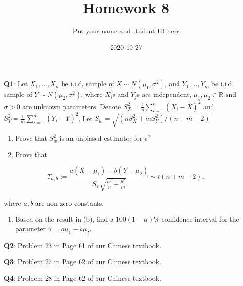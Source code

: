 \documentclass[]{article}
\title{Homework 8}
\author{Put your name and student ID here}
\date{2020-10-27}
\providecommand{\tightlist}{%
  \setlength{\itemsep}{0pt}\setlength{\parskip}{0pt}}
\begin{document}
\maketitle

\textbf{Q1}: Let \(X_1,\dots,X_n\) be i.i.d. sample of
\(X\sim N(\mu_1,\sigma^2)\), and \(Y_1,\dots,Y_m\) be i.i.d. sample of
\(Y\sim N(\mu_2,\sigma^2)\), where \(X_i\)s and \(Y_j\)s are
independent, \(\mu_1,\mu_2\in\mathbb{R}\) and \(\sigma>0\) are unknown
parameters. Denote \(S_X^2 = \frac 1n\sum_{i=1}^n(X_i-\bar X)^2\) and
\(S_Y^2 = \frac 1m\sum_{i=1}^m(Y_i-\bar Y)^2\). Let
\(S_w = \sqrt{(nS_X^2+mS_Y^2)/(n+m-2)}\)

\begin{enumerate}
\def\labelenumi{(\alph{enumi})}
\item
  Prove that \(S_w^2\) is an unbiased estimator for \(\sigma^2\)
\item
  Prove that
\end{enumerate}

\[T_{a,b}:=\frac{a(\bar X-\mu_1)-b(\bar Y-\mu_2)}{S_w\sqrt{\frac{a^2}{n}+\frac{b^2}{m}}}\sim t(n+m-2),\]

where \(a,b\) are non-zero constants.

\begin{enumerate}
\def\labelenumi{(\alph{enumi})}
\setcounter{enumi}{2}
\tightlist
\item
  Based on the result in (b), find a \(100(1-\alpha)\%\) confidence
  interval for the parameter \(\vartheta = a\mu_1-b\mu_2\).
\end{enumerate}

\textbf{Q2}: Problem 23 in Page 61 of our Chinese textbook.

\textbf{Q3}: Problem 27 in Page 62 of our Chinese textbook.

\textbf{Q4}: Problem 28 in Page 62 of our Chinese textbook.
\end{document}
